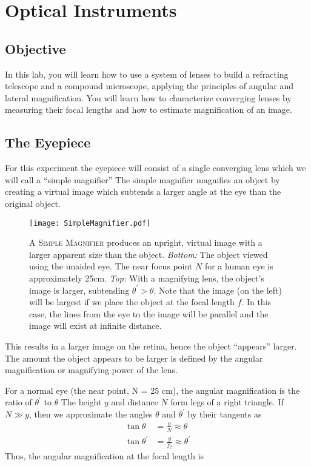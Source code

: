 \chapter{Optical Instruments}

\section{Objective}
In this lab, you will learn how to use a system of lenses to build a refracting telescope and a compound microscope, applying the principles of angular and lateral magnification.  You will learn how to characterize converging lenses by measuring their focal lengths and how to estimate magnification of an image.

\section{The Eyepiece} For this experiment the eyepiece will consist of a single converging lens which we will call a ``simple magnifier'' The simple magnifier magnifies an object by creating a virtual image which subtends a larger angle at the eye than the original object.

\begin{figure} %
  \centering
  \texttt{[image: SimpleMagnifier.pdf]}
  \caption[Simple Magnifying Lens]{\textsc{A Simple Magnifier} produces an upright, virtual image with a larger apparent size than the object.  \textit{Bottom:} The object viewed using the unaided eye.  The near focus point $N$ for a human eye is approximately 25cm.  \textit{Top:} With a magnifying lens, the object's image is larger, subtending $\theta^{\prime}>\theta$.  Note that the image (on the left) will be largest if we place the object at the focal length $f$.  In this case, the lines from the eye to the image will be parallel and the image will exist at infinite distance.}
  \label{f:mag}
\end{figure} %


This results in a larger image on the retina, hence the object ``appears'' larger. The amount the object appears to be larger is defined by the angular magnification or magnifying power of the lens.

For a normal eye (the near point, N = 25 cm), the angular magnification is the ratio of $\theta^{\prime}$ to $\theta$  The height $y$ and distance $N$ form legs of a right triangle.  If $N\gg y$, then we approximate the angles $\theta$ and $\theta^{\prime}$ by their tangents as
\begin{equation}
\begin{aligned}
	\tan\theta&=\frac{y}{N}\approx\theta\\
	\tan\theta^{\prime}&=\frac{y}{f_{2}}\approx\theta^{\prime}
\end{aligned}
\label{eq:mag-approx}
\end{equation}
Thus, the angular magnification at the focal length is


